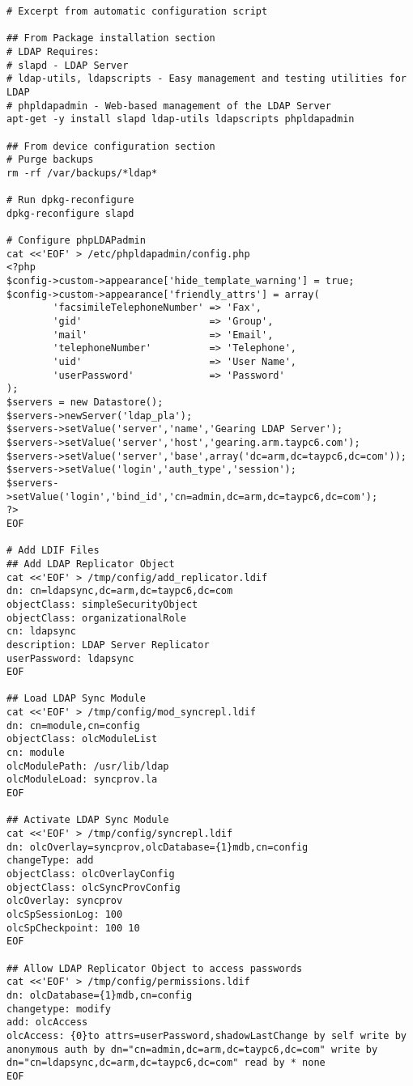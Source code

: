 \documentclass[12pt]{spieman}  %
\begin{document}
\begin{lstlisting}
# Excerpt from automatic configuration script

## From Package installation section
# LDAP Requires:
# slapd - LDAP Server
# ldap-utils, ldapscripts - Easy management and testing utilities for LDAP
# phpldapadmin - Web-based management of the LDAP Server
apt-get -y install slapd ldap-utils ldapscripts phpldapadmin

## From device configuration section
# Purge backups
rm -rf /var/backups/*ldap*

# Run dpkg-reconfigure
dpkg-reconfigure slapd	
	
# Configure phpLDAPadmin
cat <<'EOF' > /etc/phpldapadmin/config.php
<?php
$config->custom->appearance['hide_template_warning'] = true;
$config->custom->appearance['friendly_attrs'] = array(
        'facsimileTelephoneNumber' => 'Fax',
        'gid'                      => 'Group',
        'mail'                     => 'Email',
        'telephoneNumber'          => 'Telephone',
        'uid'                      => 'User Name',
        'userPassword'             => 'Password'
);
$servers = new Datastore();
$servers->newServer('ldap_pla');
$servers->setValue('server','name','Gearing LDAP Server');
$servers->setValue('server','host','gearing.arm.taypc6.com');
$servers->setValue('server','base',array('dc=arm,dc=taypc6,dc=com'));
$servers->setValue('login','auth_type','session');
$servers->setValue('login','bind_id','cn=admin,dc=arm,dc=taypc6,dc=com');
?>
EOF

# Add LDIF Files
## Add LDAP Replicator Object
cat <<'EOF' > /tmp/config/add_replicator.ldif
dn: cn=ldapsync,dc=arm,dc=taypc6,dc=com
objectClass: simpleSecurityObject
objectClass: organizationalRole
cn: ldapsync
description: LDAP Server Replicator
userPassword: ldapsync
EOF

## Load LDAP Sync Module
cat <<'EOF' > /tmp/config/mod_syncrepl.ldif
dn: cn=module,cn=config
objectClass: olcModuleList
cn: module
olcModulePath: /usr/lib/ldap
olcModuleLoad: syncprov.la
EOF

## Activate LDAP Sync Module
cat <<'EOF' > /tmp/config/syncrepl.ldif
dn: olcOverlay=syncprov,olcDatabase={1}mdb,cn=config
changeType: add
objectClass: olcOverlayConfig
objectClass: olcSyncProvConfig
olcOverlay: syncprov
olcSpSessionLog: 100
olcSpCheckpoint: 100 10
EOF

## Allow LDAP Replicator Object to access passwords
cat <<'EOF' > /tmp/config/permissions.ldif
dn: olcDatabase={1}mdb,cn=config
changetype: modify
add: olcAccess
olcAccess: {0}to attrs=userPassword,shadowLastChange by self write by anonymous auth by dn="cn=admin,dc=arm,dc=taypc6,dc=com" write by dn="cn=ldapsync,dc=arm,dc=taypc6,dc=com" read by * none
EOF


\end{lstlisting}
\end{document}
